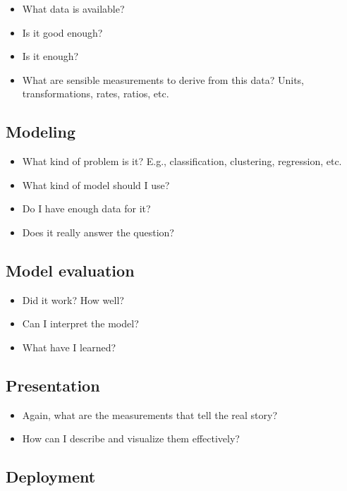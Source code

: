 \documentclass[12pt,]{book}
\providecommand{\tightlist}{%
  \setlength{\itemsep}{0pt}\setlength{\parskip}{0pt}}
\theoremstyle{definition}
\theoremstyle{definition}
\theoremstyle{remark}
\begin{document}
\begin{itemize}
\tightlist
\item
  What data is available?
\item
  Is it good enough?
\item
  Is it enough?
\item
  What are sensible measurements to derive from this data? Units,
  transformations, rates, ratios, etc.
\end{itemize}

\subsection{Modeling}\label{modeling}

\begin{itemize}
\tightlist
\item
  What kind of problem is it? E.g., classification, clustering,
  regression, etc.
\item
  What kind of model should I use?
\item
  Do I have enough data for it?
\item
  Does it really answer the question?
\end{itemize}

\subsection{Model evaluation}\label{model-evaluation}

\begin{itemize}
\tightlist
\item
  Did it work? How well?
\item
  Can I interpret the model?
\item
  What have I learned?
\end{itemize}

\subsection{Presentation}\label{presentation}

\begin{itemize}
\tightlist
\item
  Again, what are the measurements that tell the real story?
\item
  How can I describe and visualize them effectively?
\end{itemize}

\subsection{Deployment}\label{deployment}
\end{document}
